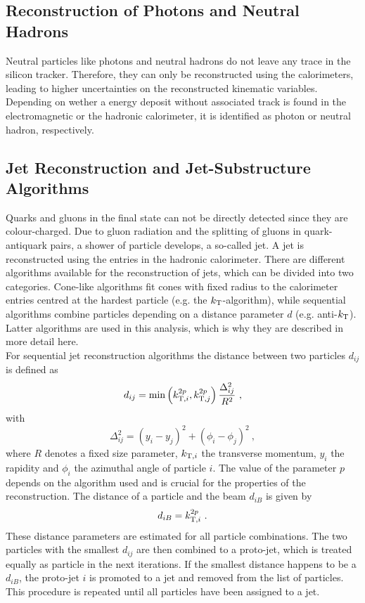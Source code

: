 \subsection{Reconstruction of Photons and Neutral Hadrons}
Neutral particles like photons and neutral hadrons do not leave any trace in the silicon tracker. Therefore, they can only be reconstructed using the calorimeters, leading to higher uncertainties on the reconstructed kinematic variables. Depending on wether a energy deposit without associated track is found in the electromagnetic or the hadronic calorimeter, it is identified as photon or neutral hadron, respectively. 
\subsection{Jet Reconstruction and Jet-Substructure Algorithms}
\label{sec:jetreco}
Quarks and gluons in the final state can not be directly detected since they are colour-charged. Due to gluon radiation and the splitting of gluons in quark-antiquark pairs, a shower of particle develops, a so-called jet. A jet is reconstructed using the entries in the hadronic calorimeter. There are different algorithms available for the reconstruction of jets, which can be divided into two categories. Cone-like algorithms fit cones with fixed radius to the calorimeter entries centred at the hardest particle (e.g. the $k_{\rm T}$-algorithm), while sequential algorithms combine particles depending on a distance parameter $d$ (e.g. anti-$k_{\rm T}$). Latter algorithms are used in this analysis, which is why they are described in more detail here.\\

\noindent For sequential jet reconstruction algorithms the distance between two particles $d_{ij}$ is defined as
\begin{align}
d_{ij} = \min\left(k_{{\rm T},i}^{2p},k_{{\rm T},j}^{2p}\right)\frac{\Delta_{ij}^2}{R^2} ~,
\end{align}
with
\begin{equation}
\Delta_{ij}^2 = (y_i-y_j)^2 + (\phi_i - \phi_j)^2 ~, \label{eq:reco:deltar}
\end{equation}
where $R$ denotes a fixed size parameter, $k_{{\rm T},i}$ the transverse momentum, $y_i$ the rapidity and $\phi_i$ the azimuthal angle of particle $i$. The value of the parameter $p$ depends on the algorithm used and is crucial for the properties of the reconstruction. The distance of a particle and the beam $d_{iB}$ is given by
\begin{equation}
d_{iB} = k_{{\rm T},i}^{2p} ~.
\end{equation}
These distance parameters are estimated for all particle combinations. The two particles with the smallest $d_{ij}$ are then combined to a proto-jet, which is treated equally as particle in the next iterations. If the smallest distance happens to be a $d_{iB}$, the proto-jet $i$ is promoted to a jet and removed from the list of particles. This procedure is repeated until all particles have been assigned to a jet.\\

